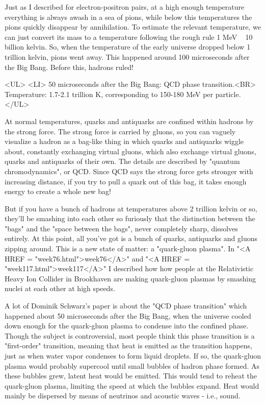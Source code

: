 Just as I described for electron-positron pairs, at a high enough
temperature everything is always awash in a sea of pions, while below
this temperatures the pions quickly disappear by annihilation.  To
estimate the relevant temperature, we can just convert its mass to a
temperature following the rough rule 1 MeV ~ 10 billion kelvin.  So,
when the temperature of the early universe dropped below 1 trillion
kelvin, pions went away.  This happened around 100 microseconds after
the Big Bang.  Before this, hadrons ruled!

<UL>
<LI>
50 microseconds after the Big Bang: QCD phase transition.<BR>
Temperature: 1.7-2.1 trillion K, corresponding to 150-180 MeV per particle.
</UL>

At normal temperatures, quarks and antiquarks are confined within
hadrons by the strong force.  The strong force is carried by gluons,
so you can vaguely visualize a hadron as a bag-like thing in which
quarks and antiquarks wiggle about, constantly exchanging virtual
gluons, which also exchange virtual gluons, quarks and antiquarks of
their own.  The details are described by "quantum chromodynamics", or
QCD.  Since QCD says the strong force gets stronger with increasing
distance, if you try to pull a quark out of this bag, it takes enough
energy to create a whole new bag!

But if you have a bunch of hadrons at temperatures above 2 trillion
kelvin or so, they'll be smashing into each other so furiously that
the distinction between the "bags" and the "space
between the bags", never completely sharp, dissolves entirely.
At this point, all you've got is a bunch of quarks, antiquarks and
gluons zipping around.  This is a new state of matter: a
"quark-gluon plasma".  In "<A HREF =
"week76.html">week76</A>" and "<A HREF =
"week117.html">week117</A>" I described how how people at the
Relativistic Heavy Ion Collider in Brookhaven are making quark-gluon
plasmas by smashing nuclei at each other at high speeds.

A lot of Dominik Schwarz's paper is about the "QCD phase transition"
which happened about 50 microseconds after the Big Bang, when the
universe cooled down enough for the quark-gluon plasma to condense
into the confined phase.  Though the subject is controversial, most
people think this phase transition is a "first-order" transition,
meaning that heat is emitted as the transition happens, just as when
water vapor condenses to form liquid droplets.  If so, the quark-gluon
plasma would probably supercool until small bubbles of hadron phase
formed.  As these bubbles grew, latent heat would be emitted.  This
would tend to reheat the quark-gluon plasma, limiting the speed at
which the bubbles expand.  Heat would mainly be dispersed by means of
neutrinos and acoustic waves - i.e., sound.

